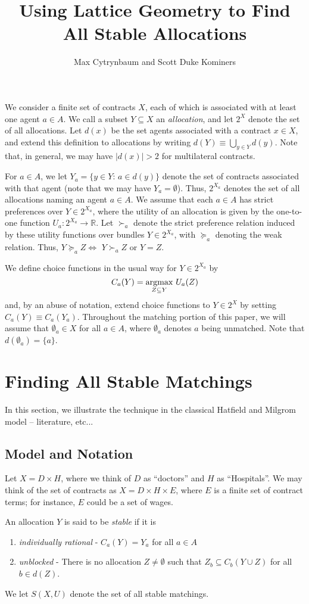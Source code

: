 \documentclass[11pt,reqno]{amsart}
\title{Using Lattice Geometry to Find All Stable Allocations}
\author{Max Cytrynbaum and Scott Duke Kominers}
\theoremstyle{definition}
\numberwithin{equation}{section}
\newcommand{\mr}{\mathbb{R}}
\newcommand{\argmax}{\operatornamewithlimits{argmax}}
\newcommand{\sub}{\subseteq}
\newcommand{\suq}{\succeq}
\newcommand{\su}{\succ}
\begin{document}
\maketitle

We consider a finite set of contracts $X$, each of which is associated with at least one agent $a\in A$. 
We call a subset $Y\sub X$ an \emph{allocation}, and let $2^X$ denote the set of all allocations. 
Let $d(x)$ be the set agents associated with a contract $x\in X$, and extend this definition to allocations by writing $d(Y) \equiv \bigcup_{y\in Y} d(y)$.
Note that, in general, we may have $|d(x)| > 2$ for multilateral contracts.

For $a\in A$, we let $Y_a = \{y\in Y: \, a\in d(y)\}$ denote the set of contracts associated with that agent (note that we may have $Y_a = \emptyset$). Thus, $2^{X_a}$ denotes the set of all allocations naming an agent $a\in A$. 
We assume that each $a\in A$ has strict preferences over $Y \in 2^{X_a}$, where the utility of an allocation is given by the one-to-one function $U_a: 2^{X_a} \to \mr$.
Let $\su_a$ denote the strict preference relation induced by these utility functions over bundles $Y \in 2^{X_a}$, with $\suq_a$ denoting the weak relation. Thus, $Y \suq_a  Z \iff$ $Y \su_a Z$ or $Y = Z$.

We define choice functions in the usual way for $Y\in 2^{X_a}$ by 
\[
C_a(Y) = \argmax_{Z\subseteq Y} \, U_a(Z)
\]
and, by an abuse of notation, extend choice functions to $Y\in 2^X$ by setting $C_a(Y) \equiv C_a(Y_a)$.
Throughout the matching portion of this paper, we will assume that $\emptyset_a \in X$ for all $a \in A$, where $\emptyset_a$ denotes $a$ being unmatched. Note that $d(\emptyset_a) = \{a\}$. 
\section{Finding All Stable Matchings} 
In this section, we illustrate the technique in the classical Hatfield and Milgrom model -- literature, etc... 
\subsection{Model and Notation} 
Let $X = D\times H$, where we think of $D$ as ``doctors'' and $H$ as ``Hospitals''. We may think of the set of contracts as $X = D\times H \times E$, where $E$ is a finite set of contract terms; for instance, $E$ could be a set of wages.

An allocation $Y$ is said to be \emph{stable} if it is 
\begin{enumerate}
\item \emph{individually rational} - $C_a(Y) = Y_a$ for all $a \in A$
\item \emph{unblocked} - There is no allocation $Z \not = \emptyset$ such that $Z_b \sub C_b(Y\cup Z)$ for all $b \in d(Z)$. 
\end{enumerate}
We let $S(X,U)$ denote the set of all stable matchings.
\end{document}
